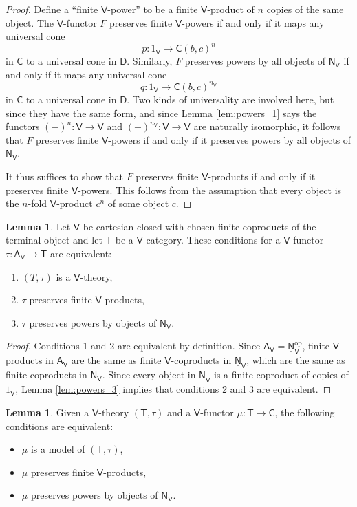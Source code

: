 \documentclass{amsart}
\theoremstyle{definition}
\newtheorem{lemma}[theorem]{Lemma}
\newcommand{\NN}{\mathsf{N}}
\newcommand{\A}{\mathsf{A}}
\newcommand{\V}{\mathsf{V}}
\newcommand{\D}{\mathsf{D}}
\newcommand{\C}{\mathsf{C}}
\newcommand{\T}{\mathsf{T}}
\newcommand{\op}{\mathrm{op}}
\newcommand{\maps}{\colon}
\begin{document}
\begin{proof}
Define a ``finite $\V$-power'' to be a finite $\V$-product of $n$ copies of the same object.
The $\V$-functor $F$ preserves finite $\V$-powers if and only if it maps any universal cone
\[        p \maps 1_\V \to \C(b,c)^n  \]
in $\C$ to a universal cone in $\D$.   Similarly, $F$ preserves powers by all objects of $\NN_\V$ if and only if it maps any universal cone
\[       q \maps 1_\V \to \C(b,c)^{n_\V}  \]
in $\C$ to a universal cone in $\D$.   Two kinds of universality are involved here, but
since they have the same form, and since Lemma \ref{lem:powers_1} says the functors $(-)^n \maps \V\to \V$ and $(-)^{n_\V} \maps \V\to \V$ are naturally isomorphic,
it follows that $F$ preserves finite $\V$-powers if and only if it preserves powers by all objects of $\NN_\V$.

It thus suffices to show that $F$ preserves finite $\V$-products if and only if it preserves
finite $\V$-powers.  This follows from the assumption that every object is the $n$-fold $\V$-product $c^n$ of some object $c$. 
\end{proof}

\begin{lemma}
\label{lem:powers_4}
Let $\V$ be cartesian closed with chosen finite coproducts of the terminal object and let
$\T$ be a $\V$-category.  These conditions for a $\V$-functor $\tau \maps \A_\V \to \T$ are equivalent:
\begin{enumerate}
\item $(T,\tau)$ is a $\V$-theory,
\item $\tau$ preserves finite $\V$-products,
\item $\tau$ preserves powers by objects of $\NN_\V$.
\end{enumerate}
\end{lemma}

\begin{proof} Conditions 1 and 2 are equivalent by definition.
Since $\A_\V = \underline{\NN}_\V^\op$, finite $\V$-products in $\A_\V$ are 
the same as finite $\V$-coproducts in $\underline{\NN}_\V$, which are the same as 
finite coproducts in $\NN_\V$.   Since every object in $\underline{\NN}_\V$ is a 
finite coproduct of copies of $1_\V$, Lemma \ref{lem:powers_3} implies that conditions
2 and 3 are equivalent.
\end{proof}

\begin{lemma}
\label{lem:powers_5}
Given a $\V$-theory $(\T,\tau)$ and a $\V$-functor $\mu \maps \T \to \C$,
the following conditions are equivalent:
\begin{itemize}
\item $\mu$ is a model of $(\T,\tau)$,
\item $\mu$ preserves finite $\V$-products,
\item $\mu$ preserves powers by objects of $\NN_\V$.
\end{itemize}
\end{lemma}
\end{document}
